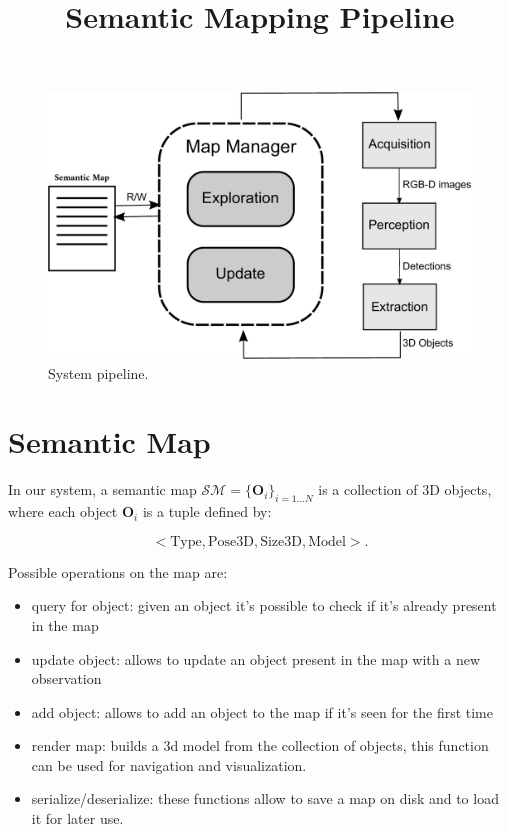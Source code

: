 \documentclass{article}
\title{\LARGE \bf Semantic Mapping Pipeline}
\begin{document}
	
	\maketitle	
	
	\begin{figure}[htbp]
		\centering
		\includegraphics[width=\linewidth]{pics/drawing-crop.pdf}
		\caption{System pipeline.}
		\label{fig:pipeline}
	\end{figure}
	
	\section*{Semantic Map}
	
	In our system, a semantic map $\mathcal{SM} = \{\mathbf{O}_i\}_{i=1 \dots N}$ is a collection of 3D objects, where each object $\mathbf{O}_i$ is a tuple defined by:
	
	\begin{equation}
			 <\text{Type},\text{Pose3D},\text{Size3D},\text{Model}>.
	\end{equation}
	
	\noindent
	Possible operations on the map are:
	
	\begin{itemize}
		\item query for object: given an object it's possible to check if it's already present in the map
		\item update object: allows to update an object present in the map with a new observation
		\item add object: allows to add an object to the map if it's seen for the first time
		\item render map: builds a 3d model from the collection of objects, this function can be used for navigation and visualization.
		\item serialize/deserialize: these functions allow to save a map on disk and to load it for later use.
	\end{itemize}
	
\end{document}
